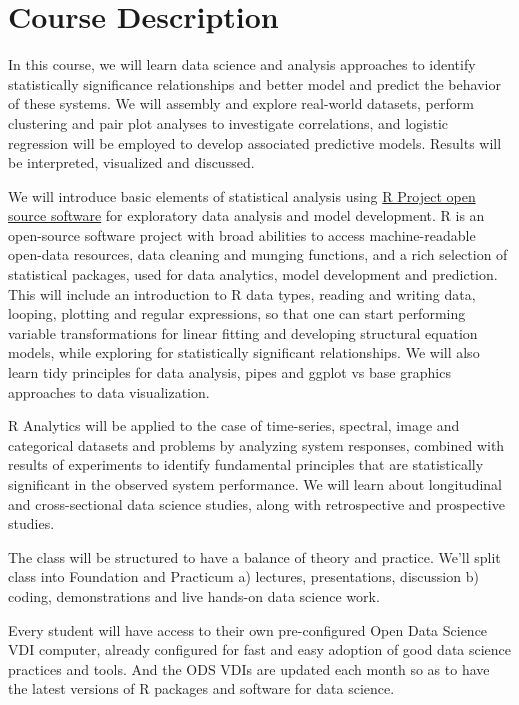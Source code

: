 \documentclass[11pt]{article} %
\begin{document}
\section{Course Description}

  In this course, we will learn data science and analysis approaches to identify statistically significance relationships and better model and predict the behavior of these systems. 
  We will assembly and explore real-world datasets, perform clustering and pair plot analyses to investigate correlations, and logistic regression will be employed to develop associated predictive models. 
  Results will be interpreted, visualized and discussed. 
  
  We will introduce basic elements of statistical analysis using \href{"http://cran.case.edu/"}{R Project open source software} for exploratory data analysis and model development. 
  R is an open-source software project with broad abilities to access machine-readable open-data resources, data cleaning and munging functions, and a rich selection of statistical packages, used for data analytics, model development and prediction. 
  This will include an introduction to R data types, reading and writing data, looping, plotting and regular expressions, so that one can start performing variable transformations for linear fitting and developing structural equation models, while exploring for statistically significant relationships. 
  We will also learn tidy principles for data analysis, pipes and ggplot vs base graphics approaches to data visualization. 
  
  R Analytics will be applied to the case of time-series, spectral, image and categorical datasets and problems by analyzing system responses, combined with results of experiments to identify fundamental principles that are statistically significant in the observed system performance. 
  We will learn about longitudinal and cross-sectional data science studies, along with retrospective and prospective studies. 
  
  The class will be structured to have a balance of theory and practice. 
  We'll split class into Foundation and Practicum
  	a) lectures, presentations, discussion
  	b) coding, demonstrations and live hands-on data science work. 
  
  Every student will have access to their own pre-configured Open Data Science VDI computer, already configured for fast and easy adoption of good data science practices and tools. 
  And the ODS VDIs are updated each month so as to have the latest versions of R packages and software for data science. 
  
\end{document}
